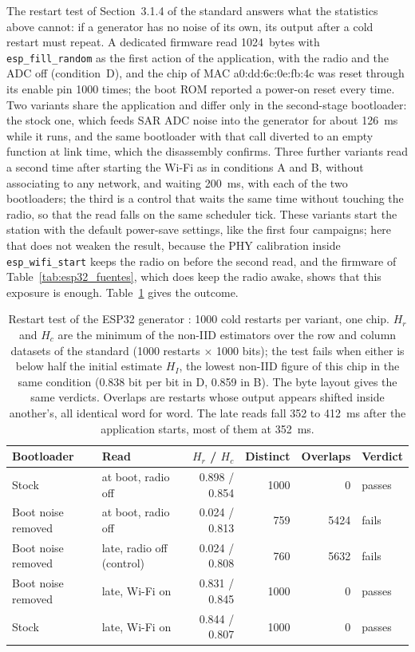 The restart test of Section~3.1.4 of the standard answers what the
statistics above cannot: if a generator has no noise of its own, its
output after a cold restart must repeat. A dedicated firmware read
1024~bytes with \texttt{esp\_fill\_random} as the first action of the
application, with the radio and the ADC off (condition~D), and the chip of
MAC a0:dd:6c:0e:fb:4c was reset through its enable pin 1000 times; the
boot ROM reported a power-on reset every time. Two variants share the
application and differ only in the second-stage bootloader: the stock
one, which feeds SAR ADC noise into the generator for about 126~ms while
it runs, and the same bootloader with that call diverted to an empty
function at link time, which the disassembly confirms. Three further
variants read a second time after starting the Wi-Fi as in conditions A
and B, without associating to any network, and waiting 200~ms, with each
of the two bootloaders; the third is a control that waits the same time
without touching the radio, so that the read falls on the same scheduler
tick. These variants start the station with the default power-save
settings, like the first four campaigns; here that does not weaken the
result, because the PHY calibration inside \texttt{esp\_wifi\_start}
keeps the radio on before the second read, and the firmware of
Table~\ref{tab:esp32_fuentes}, which does keep the radio awake, shows
that this exposure is enough. Table~\ref{tab:esp32_restart} gives the outcome.

\begin{table}[htbp]
\centering
\caption{Restart test of the ESP32 generator \meas{}: 1000 cold restarts
per variant, one chip. $H_r$ and $H_c$ are the minimum of the non-IID
estimators over the row and column datasets of the standard
(1000 restarts $\times$ 1000 bits); the test fails when either is below
half the initial estimate $H_I$, the lowest non-IID figure of this chip in
the same condition (0.838 bit per bit in D, 0.859 in B). The byte layout
gives the same verdicts. Overlaps are restarts whose output appears
shifted inside another's, all identical word for word. The late reads
fall 352 to 412~ms after the application starts, most of them at 352~ms.}
\label{tab:esp32_restart}
\footnotesize
\begin{tabular}{@{}llrrrl@{}}
\toprule
Bootloader & Read & $H_r$ / $H_c$ & Distinct & Overlaps & Verdict \\
\midrule
Stock & at boot, radio off & 0.898 / 0.854 & 1000 & 0 & passes \\
Boot noise removed & at boot, radio off & 0.024 / 0.813 & 759 & 5424 & fails \\
Boot noise removed & late, radio off (control) & 0.024 / 0.808 & 760 & 5632 & fails \\
Boot noise removed & late, Wi-Fi on & 0.831 / 0.845 & 1000 & 0 & passes \\
Stock & late, Wi-Fi on & 0.844 / 0.807 & 1000 & 0 & passes \\
\bottomrule
\end{tabular}
\end{table}

